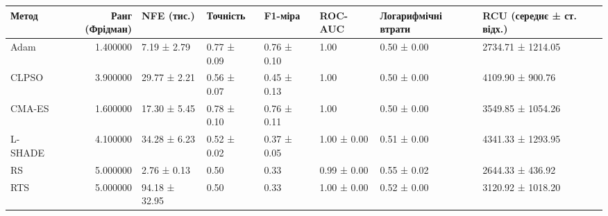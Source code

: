 \begin{tabular}{lrllllll}
\toprule
Метод & Ранг (Фрідман) & NFE (тис.) & Точність & F1-міра & ROC-AUC & Логарифмічні втрати & RCU (середнє ± ст. відх.) \\
\midrule
Adam & 1.400000 & 7.19 ± 2.79 & 0.77 ± 0.09 & 0.76 ± 0.10 & 1.00 & 0.50 ± 0.00 & 2734.71 ± 1214.05 \\
CLPSO & 3.900000 & 29.77 ± 2.21 & 0.56 ± 0.07 & 0.45 ± 0.13 & 1.00 & 0.50 ± 0.00 & 4109.90 ± 900.76 \\
CMA-ES & 1.600000 & 17.30 ± 5.45 & 0.78 ± 0.10 & 0.76 ± 0.11 & 1.00 & 0.50 ± 0.00 & 3549.85 ± 1054.26 \\
L-SHADE & 4.100000 & 34.28 ± 6.23 & 0.52 ± 0.02 & 0.37 ± 0.05 & 1.00 ± 0.00 & 0.51 ± 0.00 & 4341.33 ± 1293.95 \\
RS & 5.000000 & 2.76 ± 0.13 & 0.50 & 0.33 & 0.99 ± 0.00 & 0.55 ± 0.02 & 2644.33 ± 436.92 \\
RTS & 5.000000 & 94.18 ± 32.95 & 0.50 & 0.33 & 1.00 ± 0.00 & 0.52 ± 0.00 & 3120.92 ± 1018.20 \\
\bottomrule
\end{tabular}
